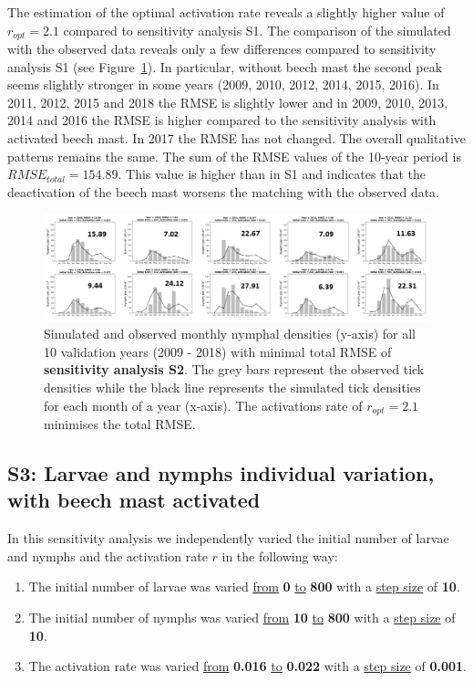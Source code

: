 \documentclass[a4paper, 11pt]{scrartcl}
\begin{document}
The estimation of the optimal activation rate reveals a slightly higher value of $r_{opt} = 2.1$ compared to sensitivity analysis S1. The comparison of the simulated with
the observed data reveals only a few differences compared to sensitivity analysis S1 (see Figure~\ref{fig:initial_ticks_without_beech}). In particular, without beech mast the
second peak seems slightly stronger in some years (2009, 2010, 2012, 2014, 2015, 2016). In 2011, 2012, 2015 and 2018 the RMSE is slightly lower and in 2009, 2010, 2013, 2014
and 2016 the RMSE is higher compared to the sensitivity analysis with activated beech mast. In 2017 the RMSE has not changed. The overall qualitative patterns remains
the same. The sum of the RMSE values of the 10-year period is $RMSE_{total} = 154.89$. This value is higher than in S1 and indicates that the deactivation of the beech mast
worsens the matching with the observed data.
\clearpage

\begin{figure}[h!]
\centering
\includegraphics[width=\linewidth]{figures/initial_ticks_without_beech}
\caption{Simulated and observed monthly nymphal densities (y-axis) for all 10 validation years (2009 - 2018) with minimal total RMSE of \textbf{sensitivity analysis S2}. The
grey bars represent the observed tick densities while the black line represents the simulated tick densities for each month of a year (x-axis). The activations rate of
$r_{opt}= 2.1$ minimises the total RMSE.}
\label{fig:initial_ticks_without_beech}
\end{figure}


\subsection{S3: Larvae and nymphs individual variation, with beech mast activated}
In this sensitivity analysis we independently varied the initial number of larvae and nymphs and the activation rate $r$ in the following way:

\begin{enumerate}
\item The initial number of larvae was varied \underline{from} \textbf{0} \underline{to} \textbf{800} with a \underline{step size} of \textbf{10}.
\item The initial number of nymphs was varied \underline{from} \textbf{10} \underline{to} \textbf{800} with a \underline{step size} of \textbf{10}.
\item The activation rate was varied \underline{from} \textbf{0.016} \underline{to} \textbf{0.022} with a \underline{step size} of \textbf{0.001}.
\end{enumerate}
\end{document}

